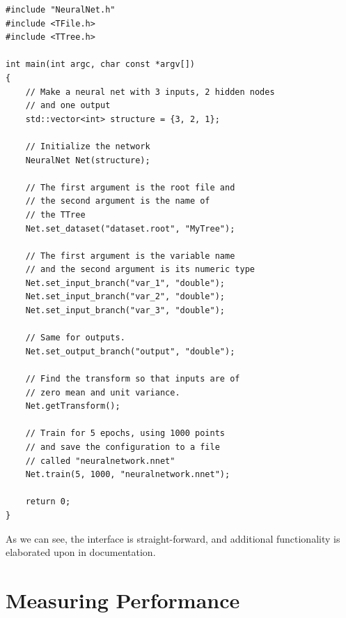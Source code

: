 \begin{small}
\begin{verbatim}
#include "NeuralNet.h"
#include <TFile.h>
#include <TTree.h>

int main(int argc, char const *argv[])
{
    // Make a neural net with 3 inputs, 2 hidden nodes
    // and one output
    std::vector<int> structure = {3, 2, 1};

    // Initialize the network
    NeuralNet Net(structure);

    // The first argument is the root file and
    // the second argument is the name of 
    // the TTree
    Net.set_dataset("dataset.root", "MyTree");

    // The first argument is the variable name
    // and the second argument is its numeric type
    Net.set_input_branch("var_1", "double");
    Net.set_input_branch("var_2", "double");
    Net.set_input_branch("var_3", "double");

    // Same for outputs.
    Net.set_output_branch("output", "double");

    // Find the transform so that inputs are of
    // zero mean and unit variance.
    Net.getTransform();

    // Train for 5 epochs, using 1000 points
    // and save the configuration to a file
    // called "neuralnetwork.nnet"
    Net.train(5, 1000, "neuralnetwork.nnet");

    return 0;
}

\end{verbatim}
\end{small}



As we can see, the interface is straight-forward, and additional functionality is elaborated upon in documentation. 

\section{Measuring Performance}


